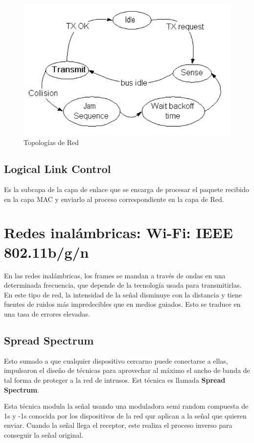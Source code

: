 \begin{figure}[H]
	\centering
	\includegraphics[width=\textwidth
]{images/csma-cd.png}
	\caption[Topologías de Red]{Topologías de Red}
	\label{fig:csma-cd}
\end{figure}

\subsection{Logical Link Control}
Es la subcapa de la capa de enlace que se encarga de procesar el paquete recibido en la capa MAC y enviarlo al proceso correspondiente en la capa de Red.

\section{Redes inalámbricas: Wi-Fi: IEEE 802.11b/g/n}
En las redes inalámbricas, los frames se mandan a través de ondas en una determinada frecuencia, que depende de la tecnología usada para transmitirlas. En este tipo de red, la intensidad de la señal disminuye con la distancia y tiene fuentes de ruidos más impredecibles que en medios guiados. Esto se traduce en una tasa de errores elevadas.

\subsection{Spread Spectrum}
Esto sumado a que cualquier dispositivo cercarno puede conectarse a ellas, impulsaron el diseño de técnicas para aprovechar al máximo el ancho de banda de tal forma de proteger a la red de intrusos. Est técnica es llamada \textbf{Spread Spectrum}.

Esta técnica modula la señal usando una moduladora semi random compuesta de 1s y -1s conocida por los dispositivos de la red qur aplican a la señal que quieren enviar. Cuando la señal llega el receptor, este realiza el proceso inverso para conseguir la señal original.

